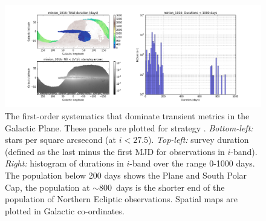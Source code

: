 

\begin{figure}
    \includegraphics[width=6.0in]{./figs/milkyway/durations_minion_1016.png}
  \caption{The first-order systematics that dominate transient metrics in the Galactic Plane. These panels are plotted for strategy . {\it Bottom-left:} stars per square arcsecond (at $i < 27.5$). {\it Top-left:} survey duration (defined as the last minus the first MJD for observations in $i$-band). {\it Right:} histogram of durations in $i$-band over the range 0-1000 days. The population below 200 days shows the Plane and South Polar Cap, the population at $\sim 800$~days is the shorter end of the population of Northern Ecliptic observations. Spatial maps are plotted in Galactic co-ordinates.}
\label{fig_durationInGalacticCoords}
\end{figure}



